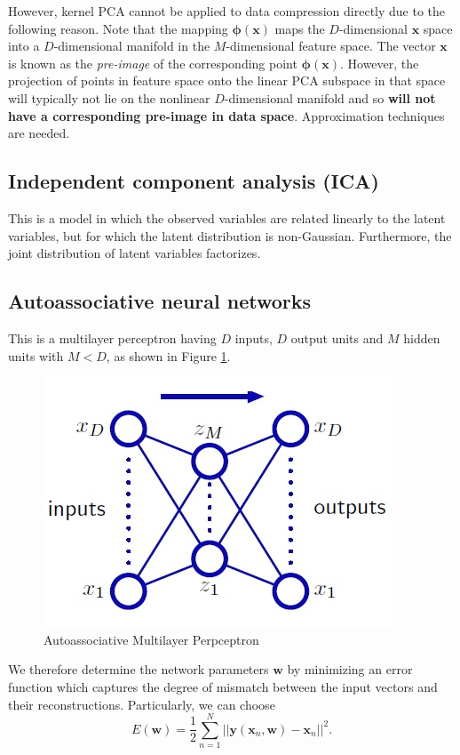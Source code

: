 \documentclass[a4paper]{book}
\renewcommand{\bf}{\mathbf}
\newcommand{\imp}[1]{\textit{#1}}
\newcommand{\bs}{\boldsymbol}
\begin{document}
However, kernel PCA cannot be applied to data compression directly due to the following reason. Note that the mapping $\bs{\phi}(\bf{x})$ maps the $D$-dimensional $\bf{x}$ space into a $D$-dimensional manifold in the $M$-dimensional feature space. The vector $\bf{x}$ is known as the \imp{pre-image} of the corresponding point $\bf{\phi}(\bf{x})$. However, the projection of points in feature space onto the linear PCA subspace in that space will typically not lie on the nonlinear $D$-dimensional manifold and so \textbf{will not have a corresponding pre-image in data space}. Approximation techniques are needed.

\subsection{Independent component analysis (ICA)}
This is a model in which the observed variables are related linearly to the latent variables, but for which the latent distribution is non-Gaussian. Furthermore, the joint distribution of latent variables factorizes.
\subsection{Autoassociative neural networks}
This is a multilayer perceptron having $D$ inputs, $D$ output units and $M$ hidden units with $M < D$, as shown in Figure \ref{ANN}.
\begin{figure}
	\centering
	\includegraphics[scale=0.5]{ANN}
	\caption{Autoassociative Multilayer Perpceptron} \label{ANN}
\end{figure}

We therefore determine the network parameters $\bf{w}$ by minimizing an error function which captures the degree of mismatch between the input vectors and their reconstructions. Particularly, we can choose
\begin{equation}
E(\bf{w}) = \frac{1}{2} \sum_{n=1}^N ||\bf{y}(\bf{x}_n,\bf{w})-\bf{x}_n||^2.
\end{equation}
\end{document}
